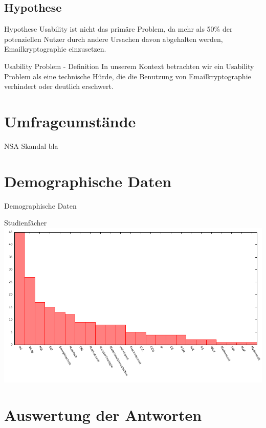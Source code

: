 \documentclass[]{beamer}
\begin{document}
\subsection{Hypothese}
\begin{frame}{Hypothese}
	Usability ist nicht das primäre Problem, da mehr als 50\% der
	potenziellen Nutzer durch andere Ursachen davon abgehalten werden,
	Email\-kryp\-to\-gra\-phie einzusetzen.
\begin{block}{Usability Problem - Definition}
	In unserem Kontext betrachten wir ein Usability Problem als eine technische Hürde,
	die die Benutzung von Emailkryptographie verhindert oder deutlich erschwert.
\end{block}
\end{frame}

\section{Umfrageumstände}
\begin{frame}{NSA Skandal}
	bla
\end{frame}

\section{Demographische Daten}
\begin{frame}{Demographische Daten}
	\begin{center}
		Studienfächer
	\includegraphics[scale=0.9]{plots/stud.pdf}
	\end{center}
\end{frame}

\section{Auswertung der Antworten}
\end{document}
